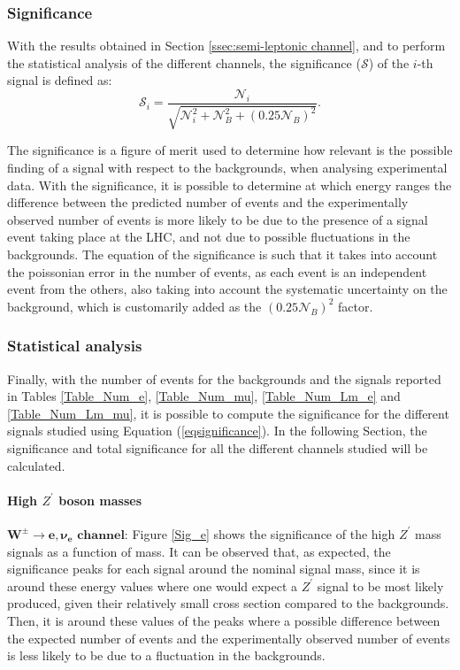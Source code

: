 \subsubsection{Significance} \label{ssec:significance}

With the results obtained in Section \ref{ssec:semi-leptonic channel}, and to perform the statistical analysis of the different channels, the significance ($\mathcal{S}$) of the $i$-th signal is defined as:
\begin{equation}
\label{eqsignificance}
    \mathcal{S}_i = \dfrac{\mathcal{N}_i}{\sqrt{\mathcal{N}_i^2 + \mathcal{N}_B^2 + (0.25 \mathcal{N}_B)^2}}.
\end{equation}

The significance is a figure of merit used to determine how relevant is the possible finding of a signal with respect to the backgrounds, when analysing experimental data. With the significance, it is possible to determine at which energy ranges the difference between the predicted number of events and the experimentally observed number of events is more likely to be due to the presence of a signal event taking place at the LHC, and not due to possible fluctuations in the backgrounds. The equation of the significance is such that it takes into account the poissonian error in the number of events, as each event is an independent event from the others, also taking into account the systematic uncertainty on the background, which is customarily added as the $(0.25\mathcal{N}_B)^2$ factor.

\subsubsection{Statistical analysis} \label{ssec:statistical}

Finally, with the number of events for the backgrounds and the signals reported in Tables \ref{Table_Num_e}, \ref{Table_Num_mu}, \ref{Table_Num_Lm_e} and \ref{Table_Num_Lm_mu}, it is possible to compute the significance for the different signals studied using Equation (\ref{eqsignificance}). In the following Section, the significance and total significance for all the different channels studied will be calculated.

\paragraph{High $Z^{\prime}$ boson masses} \label{ssec:highmasssig}

$\bm{W^{\pm} \rightarrow e, \nu_e} \textbf{ channel:}$ Figure \ref{Sig_e} shows the significance of the high $Z^{\prime}$ mass signals as a function of mass. It can be observed that, as expected, the significance peaks for each signal around the nominal signal mass, since it is around these energy values where one would expect a $Z^{\prime}$ signal to be most likely produced, given their relatively small cross section compared to the backgrounds. Then, it is around these values of the peaks where a possible difference between the expected number of events and the experimentally observed number of events is less likely to be due to a fluctuation in the backgrounds.

